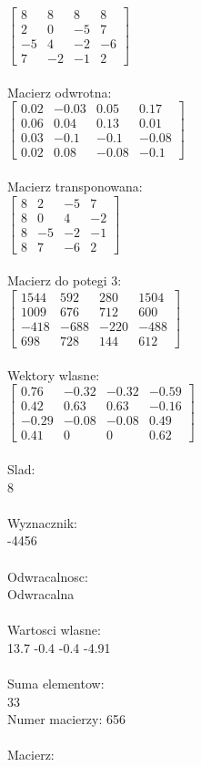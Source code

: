 \documentclass[a4paper,12pt]{article}
\begin{document}
$\begin{bmatrix} 8&8&8&8\\2&0&-5&7\\-5&4&-2&-6\\7&-2&-1&2 \end{bmatrix}$
\\
\\
Macierz odwrotna:\\

$\begin{bmatrix} 0.02&-0.03&0.05&0.17\\0.06&0.04&0.13&0.01\\0.03&-0.1&-0.1&-0.08\\0.02&0.08&-0.08&-0.1 \end{bmatrix}$
\\
\\
Macierz transponowana:\\

$\begin{bmatrix} 8&2&-5&7\\8&0&4&-2\\8&-5&-2&-1\\8&7&-6&2 \end{bmatrix}$
\\
\\
Macierz do potegi 3:\\

$\begin{bmatrix} 1544&592&280&1504\\1009&676&712&600\\-418&-688&-220&-488\\698&728&144&612 \end{bmatrix}$
\\
\\
Wektory wlasne:\\

$\begin{bmatrix} 0.76&-0.32&-0.32&-0.59\\0.42&0.63&0.63&-0.16\\-0.29&-0.08&-0.08&0.49\\0.41&0&0&0.62 \end{bmatrix}$
\\
\\
Slad:\\
8
\\
\\
Wyznacznik:\\
-4456
\\
\\
Odwracalnosc:\\
Odwracalna
\\
\\
Wartosci wlasne:\\
13.7 -0.4 -0.4 -4.91
\\
\\
Suma elementow:\\
33
\\
\newpage
Numer macierzy:
656
\\
\\
Macierz:\\
\end{document}
